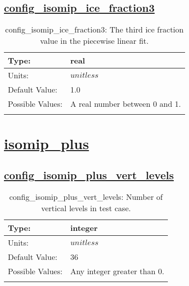 \subsection[config\_isomip\_ice\_fraction3]{\hyperref[sec:nm_tab_isomip]{config\_isomip\_ice\_fraction3}}
\label{subsec:nm_sec_config_isomip_ice_fraction3}
\begin{center}
\begin{longtable}{| p{2.0in} || p{4.0in} |}
    \hline
    Type: & real \\
    \hline
    Units: & $unitless$ \\
    \hline
    Default Value: & 1.0 \\
    \hline
    Possible Values: & A real number between 0 and 1. \\
    \hline
    \caption{config\_isomip\_ice\_fraction3: The third ice fraction value in the piecewise linear fit.}
\end{longtable}
\end{center}
\section[isomip\_plus]{\hyperref[sec:nm_tab_isomip_plus]{isomip\_plus}}
\label{sec:nm_sec_isomip_plus}
\subsection[config\_isomip\_plus\_vert\_levels]{\hyperref[sec:nm_tab_isomip_plus]{config\_isomip\_plus\_vert\_levels}}
\label{subsec:nm_sec_config_isomip_plus_vert_levels}
\begin{center}
\begin{longtable}{| p{2.0in} || p{4.0in} |}
    \hline
    Type: & integer \\
    \hline
    Units: & $unitless$ \\
    \hline
    Default Value: & 36 \\
    \hline
    Possible Values: & Any integer greater than 0. \\
    \hline
    \caption{config\_isomip\_plus\_vert\_levels: Number of vertical levels in test case.}
\end{longtable}
\end{center}
